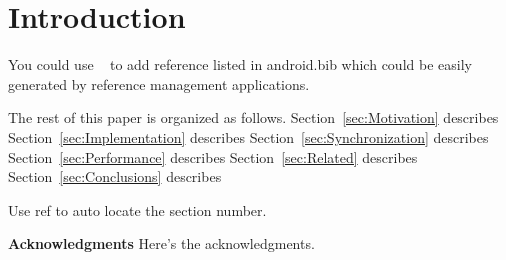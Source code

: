 \section{Introduction}
\label{sec:Introduction}

You could use ~\cite{Google:2008} to add reference listed in android.bib 
which could be easily generated by reference management applications.

The rest of this paper is organized as follows.
Section~\ref{sec:Motivation} describes 
Section~\ref{sec:Implementation} describes 
Section~\ref{sec:Synchronization} describes 
Section~\ref{sec:Performance} describes 
Section~\ref{sec:Related} describes 
Section~\ref{sec:Conclusions} describes 

Use ref to auto locate the section number.

{\bf Acknowledgments}  Here's the acknowledgments.